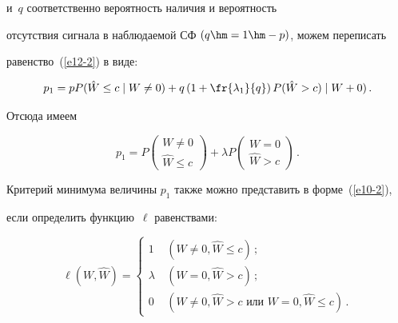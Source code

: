 и~$q$ соответственно вероятность наличия и вероятность


отсутствия сигнала в наблюдаемой СФ $(q\hm=1\hm-p)$, можем переписать


равенство~(\ref{e12-2}) в виде:


    \begin{equation*}


p_1 = p P(\hat W \le c \mid W\ne 0) + q \left(1+ \fr{\lambda_1}{q}\right) P(\hat W >c) 


\mid W+0)\,.




\end{equation*}


Отсюда имеем


\begin{equation*}


p_1= P


\begin{pmatrix}


    W\ne 0\\


    \hat W \le c


    \end{pmatrix}


    + \lambda P


    \begin{pmatrix}


    W= 0\\ \hat W > c\end{pmatrix}\,.




    \end{equation*}





Критерий минимума величины  $p_1$ также можно представить в форме~(\ref{e10-2}), 


если определить функцию~$\ell$ равенствами:


\begin{equation*}


\ell (W,\hat W) =


\begin{cases}


    1\ &(W\ne 0,\hat W\le c)\,; \\


    \lambda\ &(W=0, \hat W>c)\,;\\


    0\ &(W\ne 0,\hat W> c \mbox{\ \ или\ \ } W=0, \hat W\le c)\,.


    \end{cases}




    \end{equation*}


